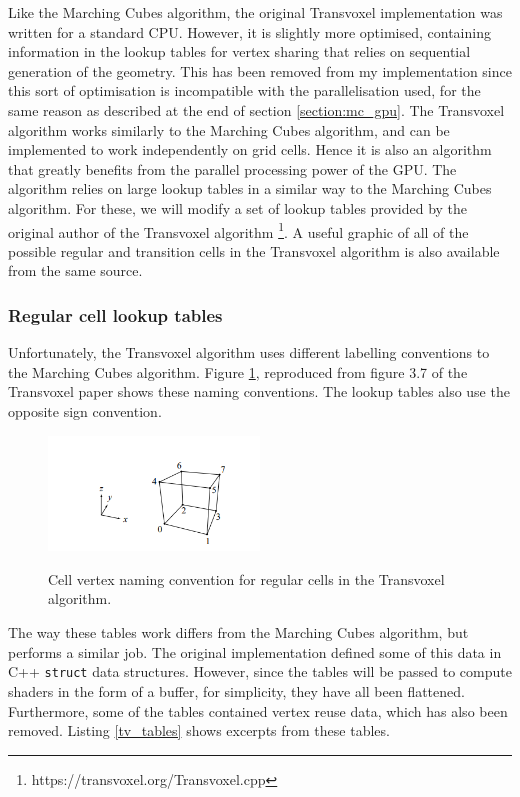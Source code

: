 \documentclass{article}
\begin{document}
Like the Marching Cubes algorithm, the original Transvoxel implementation was written for a standard CPU. However, it is slightly more optimised, containing information in the lookup tables for vertex sharing that relies on sequential generation of the geometry. This has been removed from my implementation since this sort of optimisation is incompatible with the parallelisation used, for the same reason as described at the end of section \ref{section:mc_gpu}. The Transvoxel algorithm works similarly to the Marching Cubes algorithm, and can be implemented to work independently on grid cells. Hence it is also an algorithm that greatly benefits from the parallel processing power of the GPU. The algorithm relies on large lookup tables in a similar way to the Marching Cubes algorithm. For these, we will modify a set of lookup tables provided by the original author of the Transvoxel algorithm \footnote{https://transvoxel.org/Transvoxel.cpp}. A useful graphic of all of the possible regular and transition cells in the Transvoxel algorithm is also available from the same source\cite{lengyel}.

\subsubsection{Regular cell lookup tables}
Unfortunately, the Transvoxel algorithm uses different labelling conventions to the Marching Cubes algorithm. Figure \ref{fig:tv_labels}, reproduced from figure 3.7 of the Transvoxel paper\cite{lengyel_2010} shows these naming conventions. The lookup tables also use the opposite sign convention.

\begin{figure}
  \caption{Cell vertex naming convention for regular cells in the Transvoxel algorithm.}
  \includegraphics[width=0.5\textwidth]{tv_labels.PNG}
  \label{fig:tv_labels}
\end{figure}
The way these tables work differs from the Marching Cubes algorithm, but performs a similar job. The original implementation defined some of this data in C++ \texttt{struct} data structures. However, since the tables will be passed to compute shaders in the form of a buffer, for simplicity, they have all been flattened. Furthermore, some of the tables contained vertex reuse data, which has also been removed.
Listing \ref{tv_tables} shows excerpts from these tables.
\end{document}
